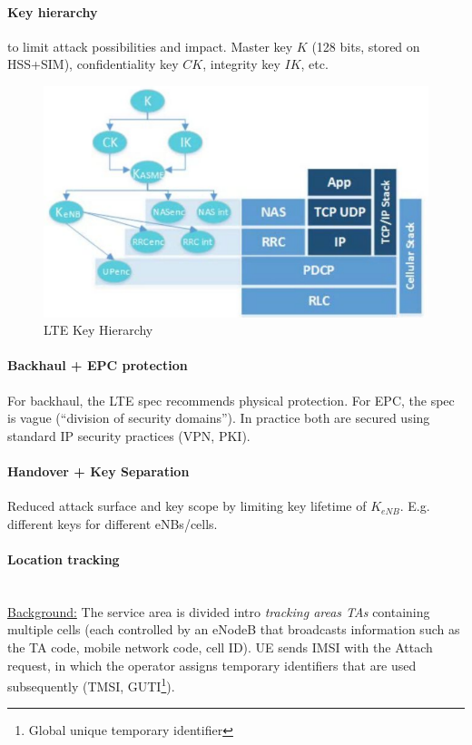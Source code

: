 \paragraph{Key hierarchy}
to limit attack possibilities and impact. Master key $K$ (128 bits, stored on
HSS+SIM), confidentiality key $CK$, integrity key $IK$, etc.
\begin{figure}
	\centering
	\includegraphics[scale=0.5]{images/10-4g-key-hierarchy.png}
	\caption{LTE Key Hierarchy}
	\label{fig:4g-key-hierarchy}
\end{figure}

\paragraph{Backhaul + EPC protection}
For backhaul, the LTE spec recommends physical protection. For EPC, the spec is
vague (``division of security domains''). In practice both are secured using
standard IP security practices (VPN, PKI).

\paragraph{Handover + Key Separation}
Reduced attack surface and key scope by limiting key lifetime of $K_{eNB}$.
E.g. different keys for different eNBs/cells.

\paragraph{Location tracking} \mbox{} \\
\underline{Background:}
The service area is divided intro \textit{tracking areas TAs} containing multiple cells (each controlled by an eNodeB that broadcasts information such as the TA code, mobile network code, cell ID).
UE sends IMSI with the Attach request, in which the operator assigns temporary identifiers that are used subsequently (TMSI, GUTI\footnote{Global unique temporary identifier}).

